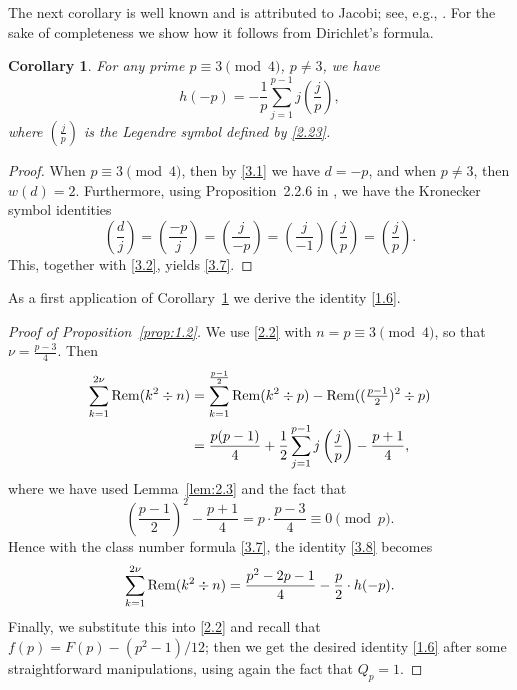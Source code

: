\documentclass{amsart}
\theoremstyle{plain}
\newtheorem{corollary}[theorem]{Corollary}
\numberwithin{equation}{section}
\begin{document}
The next corollary is well known and is attributed to Jacobi; see, e.g.,
\cite[Ch.~6]{Da}. For the sake of completeness we show how it follows from 
Dirichlet's formula.

\begin{corollary}\label{cor:3.3}
For any prime $p\equiv 3\pmod{4}$, $p\neq 3$, we have
\begin{equation}\label{3.7}
h(-p)=-\frac{1}{p}\sum_{j=1}^{p-1}j\left(\frac{j}{p}\right),
\end{equation}
where $(\frac{j}{p})$ is the Legendre symbol defined by \eqref{2.23}.
\end{corollary}

\begin{proof}
When $p\equiv 3\pmod{4}$, then by \eqref{3.1} we have $d=-p$, and when
$p\neq 3$, then $w(d)=2$. Furthermore, using Proposition~2.2.6 in
\cite[p.~36]{Co1}, we have the Kronecker symbol identities
\[
\left(\frac{d}{j}\right)=\left(\frac{-p}{j}\right)=\left(\frac{j}{-p}\right)
=\left(\frac{j}{-1}\right)\left(\frac{j}{p}\right)=\left(\frac{j}{p}\right).
\]
This, together with \eqref{3.2}, yields \eqref{3.7}.
\end{proof}

As a first application of Corollary~\ref{cor:3.3} we derive the identity
\eqref{1.6}.

\begin{proof}[Proof of Proposition~\ref{prop:1.2}]
We use \eqref{2.2} with $n=p\equiv 3\pmod{4}$, so that $\nu=\frac{p-3}{4}$. Then
\begin{align}
\sum_{k=1}^{2\nu}{\rm Rem}(k^2\div n)
&=\sum_{k=1}^{\frac{p-1}{2}}{\rm Rem}(k^2\div p)
-{\rm Rem}((\tfrac{p-1}{2})^2\div p)\label{3.8}\\
&=\frac{p(p-1)}{4}+\frac{1}{2}\sum_{j=1}^{p-1}j\left(\frac{j}{p}\right)
-\frac{p+1}{4},\nonumber
\end{align}
where we have used Lemma~\ref{lem:2.3} and the fact that
\begin{equation}\label{3.9}
\left(\frac{p-1}{2}\right)^2-\frac{p+1}{4}=p\cdot\frac{p-3}{4}\equiv 0\pmod{p}.
\end{equation}
Hence with the class number formula \eqref{3.7}, the identity \eqref{3.8}
becomes
\[
\sum_{k=1}^{2\nu}{\rm Rem}(k^2\div n)
=\frac{p^2-2p-1}{4}-\frac{p}{2}\cdot h(-p).
\]
Finally, we substitute this into \eqref{2.2} and recall that 
$f(p)=F(p)-(p^2-1)/12$; then we get the desired identity \eqref{1.6} after some
straightforward manipulations, using again the fact that $Q_p=1$.
\end{proof}
\end{document}
